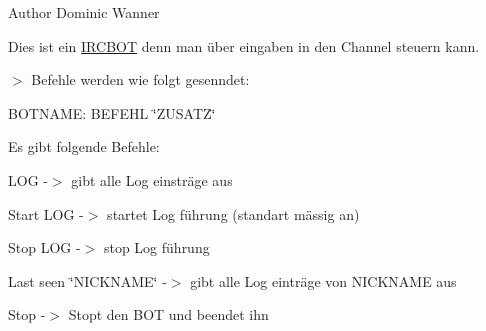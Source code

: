 \begin{DoxyAuthor}{\-Author}
\-Dominic \-Wanner
\end{DoxyAuthor}
\-Dies ist ein \hyperlink{classIRCBOT}{\-I\-R\-C\-B\-O\-T} denn man über eingaben in den \-Channel steuern kann. \par
$>$ \-Befehle werden wie folgt gesenndet\-:\par
 \-B\-O\-T\-N\-A\-M\-E\-: \-B\-E\-F\-E\-H\-L \char`\"{}\-Z\-U\-S\-A\-T\-Z\char`\"{}\par
\par
 \-Es gibt folgende \-Befehle\-:\par
\par
 \-L\-O\-G -\/$>$ gibt alle \-Log einsträge aus\par
 \-Start \-L\-O\-G -\/$>$ startet \-Log führung (standart mässig an)\par
 \-Stop \-L\-O\-G -\/$>$ stop \-Log führung\par
 \-Last seen \char`\"{}\-N\-I\-C\-K\-N\-A\-M\-E\char`\"{} -\/$>$ gibt alle \-Log einträge von \-N\-I\-C\-K\-N\-A\-M\-E aus\par
 \-Stop -\/$>$ \-Stopt den \-B\-O\-T und beendet ihn\par
 